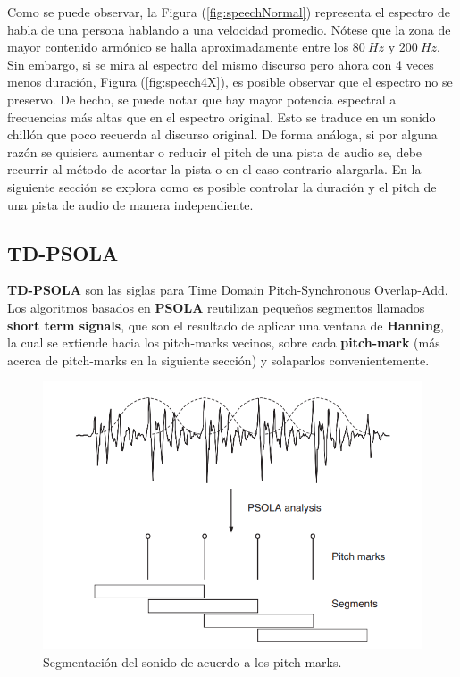 Como se puede observar, la Figura (\ref{fig:speechNormal}) representa el espectro de habla de una persona hablando a una velocidad promedio. Nótese que la zona de mayor contenido armónico se halla aproximadamente entre los $80 \ Hz$ y $200 \ Hz$. Sin embargo, si se mira al espectro del mismo discurso pero ahora con 4 veces menos duración, Figura (\ref{fig:speech4X}), es posible observar que el espectro no se preservo. De hecho, se puede notar que hay mayor potencia espectral a frecuencias más altas que en el espectro original. Esto se traduce en un sonido chillón que poco recuerda al discurso original. De forma análoga, si por alguna razón se quisiera aumentar o reducir el pitch de una pista de audio se, debe recurrir al método de acortar la pista o en el caso contrario alargarla. 
En la siguiente sección se explora como es posible controlar la duración y el pitch de una pista de audio de manera independiente.

\subsection{TD-PSOLA}
\textbf{TD-PSOLA} son las siglas para Time Domain Pitch-Synchronous Overlap-Add. Los algoritmos basados en \textbf{PSOLA} reutilizan pequeños segmentos llamados \textbf{short term signals}, que son el resultado de aplicar una ventana de \textbf{Hanning}, la cual se extiende hacia los pitch-marks vecinos, sobre cada \textbf{pitch-mark} (más acerca de pitch-marks en la siguiente sección) y solaparlos convenientemente.

\begin{figure}[H]
	\centering
	\includegraphics[width=0.7\linewidth]{ImagenesEjercicio5/PSOLA_MAIN_IDEA.PNG}
	\caption{Segmentación del sonido de acuerdo a los pitch-marks.}
	\label{fig:clarification-of-the-psola-technique-adopted-from-kortekaas-1997}
\end{figure}

